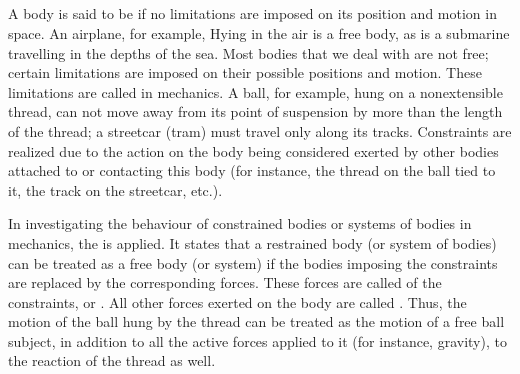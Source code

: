 \subsection{}\label{2.2.3} A body is said to be  if no limitations are imposed on its position and motion in space. An airplane, for example, Hying in the air is a free body, as is a submarine travelling in the depths of the sea. Most bodies that we deal with are not free; certain limitations are imposed on their possible positions and motion. These limitations are called  in mechan­ics. A ball, for example, hung on a nonextensible thread, can­ not move away from its point of suspension by more than the length of the thread; a streetcar (tram) must travel only along its tracks. Constraints are realized due to the action on the body being considered exerted by other bodies attached to or contacting this body (for instance, the thread on the ball tied to it, the track on the streetcar, etc.).

In investigating the behaviour of constrained bodies or systems of bodies in mechanics, the  is applied. It states that a restrained body (or system of bodies) can be treated as a free body (or system) if the bodies imposing the constraints are replaced by the corresponding forces. These forces are called  of the constraints, or . All other forces exerted on the body are called . Thus, the motion of the ball hung by the thread can be treated as the motion of a free ball subject, in addition to all the active forces applied to it (for instance, gravity), to the reaction of the thread as well.


